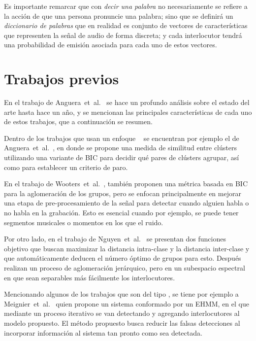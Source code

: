 Es importante remarcar que con \textit{decir una palabra} no necesariamente se refiere a la acción de que una persona pronuncie una palabra; sino que se definirá un \textit{diccionario de palabras} que en realidad es conjunto de vectores de características que representen la señal de audio de forma discreta; y cada interlocutor tendrá una probabilidad de emisión asociada para cada uno de estos vectores.

\section{Trabajos previos}

En el trabajo de Anguera~et~al.~\cite{AngueraMiro2012} se hace un profundo análisis sobre el estado del arte hasta hace un año, y se mencionan las principales características de cada uno de estos trabajos, que a continuación se resumen.

Dentro de los trabajos que usan un enfoque \bu~ se encuentran por ejemplo el de Anguera~et~al.~\cite{AngueraMiro2006}, en donde se propone una medida de similitud entre clústers utilizando una variante de \ac{BIC} para decidir qué pares de clústers agrupar, así como para establecer un criterio de paro.

En el trabajo de Wooters~et~al.~\cite{Wooters2007}, también proponen una métrica basada en \ac{BIC} para la aglomeración de los grupos, pero se enfocan principalmente en mejorar una etapa de pre-procesamiento de la señal para detectar cuando alguien habla o no habla en la grabación. Esto es esencial cuando por ejemplo, se puede tener segmentos musicales o momentos en los que el ruido.

Por otro lado, en el trabajo de Nguyen~et~al.~\cite{Nguyen2009} se presentan dos funciones objetivo que buscan maximizar la distancia intra-clase y la distancia inter-clase y que automáticamente deducen el número óptimo de grupos para esto. Después realizan un proceso de aglomeración jerárquico, pero en un subespacio espectral en que sean separables más fácilmente los interlocutores.

Mencionando algunos de los trabajos que son del tipo \td, se tiene por ejemplo a Meignier~et~al.~\cite{Meignier2001} quien propone un sistema conformado por un \ac{EHMM}, en el que mediante un proceso iterativo se van detectando y agregando interlocutores al modelo propuesto. El método propuesto busca reducir las falsas detecciones al incorporar información al sistema tan pronto 
como sea detectada. 

